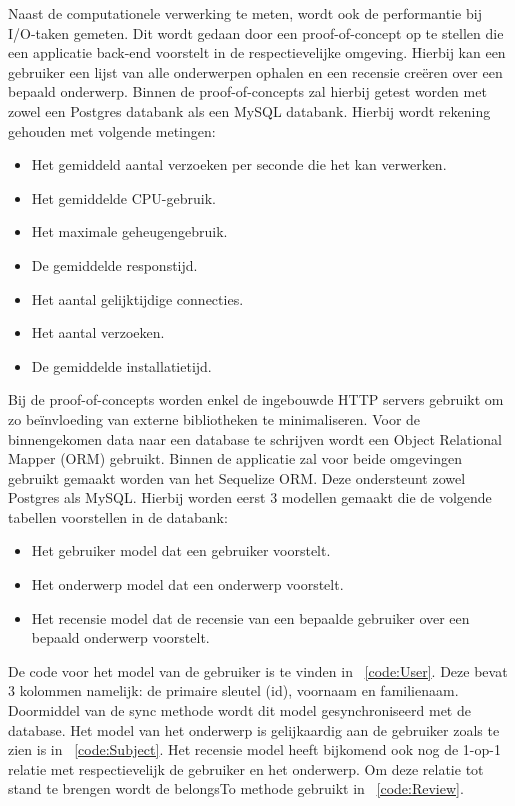 Naast de computationele verwerking te meten, wordt ook de performantie bij I/O-taken gemeten.
Dit wordt gedaan door een proof-of-concept op te stellen die een applicatie back-end voorstelt in de respectievelijke omgeving.
Hierbij kan een gebruiker een lijst van alle onderwerpen ophalen en een recensie creëren over een bepaald onderwerp. 
Binnen de proof-of-concepts zal hierbij getest worden met zowel een Postgres databank als een MySQL databank.
Hierbij wordt rekening gehouden met volgende metingen:
\begin{itemize}
    \item Het gemiddeld aantal verzoeken per seconde die het kan verwerken.
    \item Het gemiddelde CPU-gebruik.
    \item Het maximale geheugengebruik.
    \item De gemiddelde responstijd.
    \item Het aantal gelijktijdige connecties.
    \item Het aantal verzoeken.
    \item De gemiddelde installatietijd.
\end{itemize}
Bij de proof-of-concepts worden enkel de ingebouwde HTTP servers gebruikt om zo beïnvloeding van externe bibliotheken te minimaliseren.
Voor de binnengekomen data naar een database te schrijven wordt een Object Relational Mapper (ORM) gebruikt.
Binnen de applicatie zal voor beide omgevingen gebruikt gemaakt worden van het Sequelize ORM. Deze ondersteunt zowel Postgres als MySQL.
Hierbij worden eerst 3 modellen gemaakt die de volgende tabellen voorstellen in de databank:
\begin{itemize}
  \item Het gebruiker model dat een gebruiker voorstelt.
  \item Het onderwerp model dat een onderwerp voorstelt.
  \item Het recensie model dat de recensie van een bepaalde gebruiker over een bepaald onderwerp voorstelt.
\end{itemize}
De code voor het model van de gebruiker is te vinden in ~\ref{code:User}. Deze bevat 3 kolommen namelijk: de primaire sleutel (id), voornaam en familienaam.
Doormiddel van de sync methode wordt dit model gesynchroniseerd met de database. 
Het model van het onderwerp is gelijkaardig aan de gebruiker zoals te zien is in ~\ref{code:Subject}. Het recensie model heeft bijkomend 
ook nog de 1-op-1 relatie met respectievelijk de gebruiker en het onderwerp.
Om deze relatie tot stand te brengen wordt de belongsTo methode gebruikt in ~\ref{code:Review}. 
